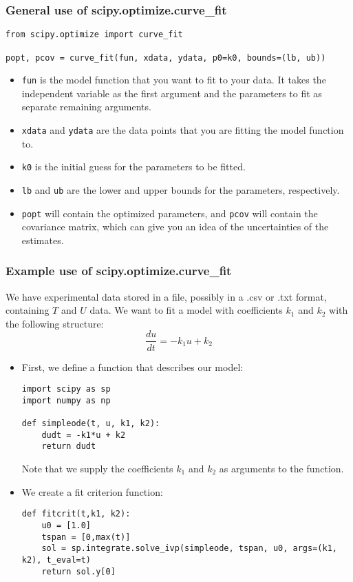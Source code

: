   
  \begin{frame}[fragile] 
  \frametitle{General use of scipy.optimize.curve\_fit}
  \begin{lstlisting}
from scipy.optimize import curve_fit

popt, pcov = curve_fit(fun, xdata, ydata, p0=k0, bounds=(lb, ub))
  \end{lstlisting}
  \begin{itemize}
    \item \lstinline$fun$ is the model function that you want to fit to your data. It takes the independent variable as the first argument and the parameters to fit as separate remaining arguments.
    \item \lstinline$xdata$ and \lstinline$ydata$ are the data points that you are fitting the model function to.
    \item \lstinline$k0$ is the initial guess for the parameters to be fitted.
    \item \lstinline$lb$ and \lstinline$ub$ are the lower and upper bounds for the parameters, respectively.
    \item \lstinline$popt$ will contain the optimized parameters, and \lstinline$pcov$ will contain the covariance matrix, which can give you an idea of the uncertainties of the estimates.
  \end{itemize}  
  \end{frame}
    

  \begin{frame}[fragile] 
    \frametitle{Example use of scipy.optimize.curve\_fit}
    We have experimental data stored in a file, possibly in a .csv or .txt format, containing $T$ and $U$ data. We want to fit a model with coefficients $k_1$ and $k_2$ with the following structure:
    \[
      \frac{du}{dt} = -k_1 u + k_2
    \]
    \pause
    \begin{itemize}
      \item First, we define a function that describes our model:
      \begin{lstlisting}
import scipy as sp
import numpy as np

def simpleode(t, u, k1, k2):
    dudt = -k1*u + k2
    return dudt
      \end{lstlisting}
      Note that we supply the coefficients \(k_1\) and \(k_2\) as arguments to the function.
      \pause
      \item We create a fit criterion function:
      \begin{lstlisting}
def fitcrit(t,k1, k2):
    u0 = [1.0]
    tspan = [0,max(t)]
    sol = sp.integrate.solve_ivp(simpleode, tspan, u0, args=(k1, k2), t_eval=t)
    return sol.y[0]
      \end{lstlisting}
    \end{itemize}
    \end{frame}
    
